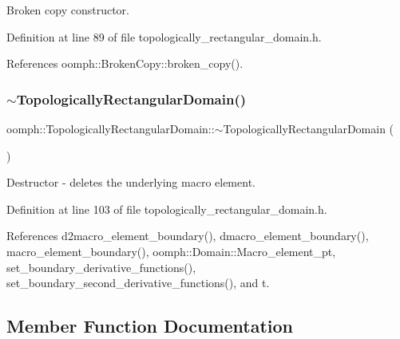 Broken copy constructor. 



Definition at line 89 of file topologically\+\_\+rectangular\+\_\+domain.\+h.



References oomph\+::\+Broken\+Copy\+::broken\+\_\+copy().

\mbox{\label{classoomph_1_1TopologicallyRectangularDomain_aa7b1e4911a2b0ac8f599819faa2c9b27}} 
\subsubsection{\texorpdfstring{$\sim$\+Topologically\+Rectangular\+Domain()}{~TopologicallyRectangularDomain()}}
{\footnotesize\ttfamily oomph\+::\+Topologically\+Rectangular\+Domain\+::$\sim$\+Topologically\+Rectangular\+Domain (\begin{DoxyParamCaption}{ }\end{DoxyParamCaption})\hspace{0.3cm}{\ttfamily [inline]}}



Destructor -\/ deletes the underlying macro element. 



Definition at line 103 of file topologically\+\_\+rectangular\+\_\+domain.\+h.



References d2macro\+\_\+element\+\_\+boundary(), dmacro\+\_\+element\+\_\+boundary(), macro\+\_\+element\+\_\+boundary(), oomph\+::\+Domain\+::\+Macro\+\_\+element\+\_\+pt, set\+\_\+boundary\+\_\+derivative\+\_\+functions(), set\+\_\+boundary\+\_\+second\+\_\+derivative\+\_\+functions(), and t.



\subsection{Member Function Documentation}
\mbox{\label{classoomph_1_1TopologicallyRectangularDomain_a0b882a9e660cab447c6be8cbeb8c9c18}} 
